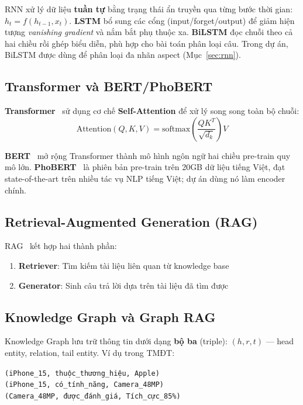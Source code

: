 \documentclass[12pt,a4paper]{article}
\begin{document}
RNN xử lý dữ liệu \textbf{tuần tự} bằng trạng thái ẩn truyền qua từng bước thời gian: $h_t = f(h_{t-1}, x_t)$. \textbf{LSTM} bổ sung các cổng (input/forget/output) để giảm hiện tượng \textit{vanishing gradient} và nắm bắt phụ thuộc xa. \textbf{BiLSTM} đọc chuỗi theo cả hai chiều rồi ghép biểu diễn, phù hợp cho bài toán phân loại câu. Trong dự án, BiLSTM được dùng để phân loại đa nhãn aspect (Mục~\ref{sec:rnn}).

\subsection{Transformer và BERT/PhoBERT}

\textbf{Transformer}~\cite{vaswani2017} sử dụng cơ chế \textbf{Self-Attention} để xử lý song song toàn bộ chuỗi:
\[
  \text{Attention}(Q, K, V) = \text{softmax}\left(\frac{QK^T}{\sqrt{d_k}}\right) V
\]

\textbf{BERT}~\cite{devlin2019} mở rộng Transformer thành mô hình ngôn ngữ hai chiều pre-train quy mô lớn. \textbf{PhoBERT}~\cite{phobert2020} là phiên bản pre-train trên 20GB dữ liệu tiếng Việt, đạt state-of-the-art trên nhiều tác vụ NLP tiếng Việt; dự án dùng nó làm encoder chính.

\subsection{Retrieval-Augmented Generation (RAG)}

RAG~\cite{lewis2020rag} kết hợp hai thành phần:
\begin{enumerate}
  \item \textbf{Retriever}: Tìm kiếm tài liệu liên quan từ knowledge base
  \item \textbf{Generator}: Sinh câu trả lời dựa trên tài liệu đã tìm được
\end{enumerate}

\subsection{Knowledge Graph và Graph RAG}

Knowledge Graph lưu trữ thông tin dưới dạng \textbf{bộ ba} (triple): $(h, r, t)$ --- head entity, relation, tail entity. Ví dụ trong TMĐT:

\begin{center}
\texttt{(iPhone\_15, thuộc\_thương\_hiệu, Apple)} \\
\texttt{(iPhone\_15, có\_tính\_năng, Camera\_48MP)} \\
\texttt{(Camera\_48MP, được\_đánh\_giá, Tích\_cực\_85\%)}
\end{center}
\end{document}
